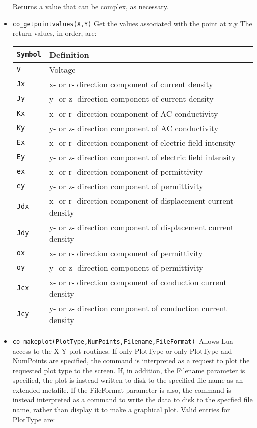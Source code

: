 \begin{itemize}
Returns a value that can be complex, as necessary.

\item \texttt{co\_getpointvalues(X,Y)} Get the values associated with the point at x,y
The return values, in order, are:

\begin{tabular}{ll}
\texttt{Symbol} &  Definition \\ \hline
\texttt{V} & Voltage \\
\texttt{Jx} & x- or r- direction component of current density \\
\texttt{Jy} & y- or z- direction component of current density \\
\texttt{Kx} & x- or r- direction component of AC conductivity \\
\texttt{Ky} & y- or z- direction component of AC conductivity \\
\texttt{Ex} & x- or r- direction component of electric field intensity \\
\texttt{Ey} & y- or z- direction component of electric field intensity \\
\texttt{ex} & x- or r- direction component of permittivity \\
\texttt{ey} & y- or z- direction component of permittivity \\
\texttt{Jdx} & x- or r- direction component of displacement current density \\
\texttt{Jdy} & y- or z- direction component of displacement current density \\
\texttt{ox} & x- or r- direction component of permittivity \\
\texttt{oy} & y- or z- direction component of permittivity \\
\texttt{Jcx} & x- or r- direction component of conduction current density \\
\texttt{Jcy} & y- or z- direction component of conduction current density \\
\end{tabular}

\item \texttt{co\_makeplot(PlotType,NumPoints,Filename,FileFormat) }Allows Lua access
to the X-Y plot routines. If only PlotType or only PlotType and NumPoints
are specified, the command is interpreted as a request to plot the requested
plot type to the screen. If, in addition, the Filename parameter is
specified, the plot is instead written to disk to the specified file name as
an extended metafile. If the FileFormat parameter is also, the command is
instead interpreted as a command to write the data to disk to the specfied
file name, rather than display it to make a graphical plot. Valid entries
for PlotType are:


\end{itemize}
